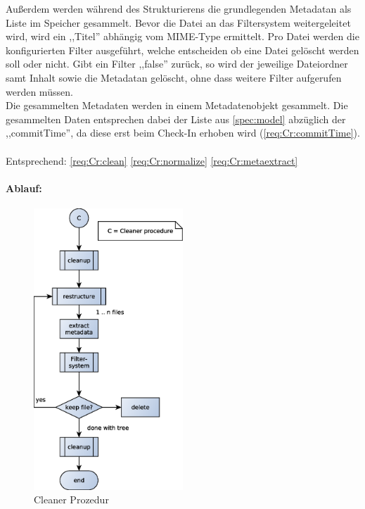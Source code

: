 Außerdem werden während des Strukturierens die grundlegenden Metadatan als Liste im Speicher gesammelt.
Bevor die Datei an das Filtersystem weitergeleitet wird, wird ein ,,Titel'' abhängig vom MIME-Type ermittelt.
Pro Datei werden die konfigurierten Filter ausgeführt, welche entscheiden ob eine Datei gelöscht werden soll oder nicht.
Gibt ein Filter ,,false'' zurück, so wird der jeweilige Dateiordner samt Inhalt sowie die Metadatan gelöscht,
ohne dass weitere Filter aufgerufen werden müssen.
\\
Die gesammelten Metadaten werden in einem Metadatenobjekt gesammelt. Die gesammelten Daten entsprechen dabei 
der Liste aus \ref{spec:model} abzüglich der ,,commitTime'', da diese erst beim Check-In erhoben wird (\ref{req:Cr:commitTime}).
\\
\\
Entsprechend:
\ref{req:Cr:clean}
\ref{req:Cr:normalize}
\ref{req:Cr:metaextract}

\newpage
\paragraph{Ablauf:}
\label{par:ablauf_}
\hfill
\begin{figure}[H]
	\centering
	\includegraphics[width=0.5\textwidth]{design/backend/gfx/cleaner.eps}
	\caption{Cleaner Prozedur}
\end{figure}
